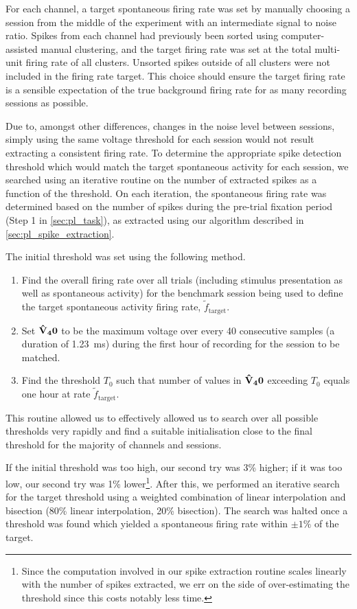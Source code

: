 For each channel, a target spontaneous firing rate was set by manually choosing a session from the middle of the experiment with an intermediate signal to noise ratio.
Spikes from each channel had previously been sorted using computer-assisted manual clustering, and the target firing rate was set at the total multi-unit firing rate of all clusters.
Unsorted spikes outside of all clusters were not included in the firing rate target.
This choice should ensure the target firing rate is a sensible expectation of the true background firing rate for as many recording sessions as possible.

Due to, amongst other differences, changes in the noise level between sessions, simply using the same voltage threshold for each session would not result extracting a consistent firing rate.
To determine the appropriate spike detection threshold which would match the target spontaneous activity for each session, we searched using an iterative routine on the number of extracted spikes as a function of the threshold.
On each iteration, the spontaneous firing rate was determined based on the number of spikes during the pre-trial fixation period (Step 1 in \autoref{sec:pl_task}), as extracted using our algorithm described in \autoref{sec:pl_spike_extraction}.

The initial threshold was set using the following method.
\begin{enumerate}
\item Find the overall firing rate over all trials (including stimulus presentation as well as spontaneous activity) for the benchmark session being used to define the target spontaneous activity firing rate, $\tilde{f}_\text{target}$.
\item Set $\mathbf{\hat{V}_40}$ to be the maximum voltage over every 40 consecutive samples (a duration of \SI{1.23}{\milli\second}) during the first hour of recording for the session to be matched.
\item Find the threshold $T_0$ such that number of values in $\mathbf{\hat{V}_40}$ exceeding $T_0$ equals one hour at rate $\tilde{f}_\text{target}$.
\end{enumerate}
This routine allowed us to effectively allowed us to search over all possible thresholds very rapidly and find a suitable initialisation close to the final threshold for the majority of channels and sessions.

If the initial threshold was too high, our second try was 3\% higher; if it was too low, our second try was 1\% lower\footnote{Since the computation involved in our spike extraction routine scales linearly with the number of spikes extracted, we err on the side of over-estimating the threshold since this costs notably less time.}.
After this, we performed an iterative search for the target threshold using a weighted combination of linear interpolation and bisection (80\% linear interpolation, 20\% bisection).
The search was halted once a threshold was found which yielded a spontaneous firing rate within $\pm1\%$ of the target.

